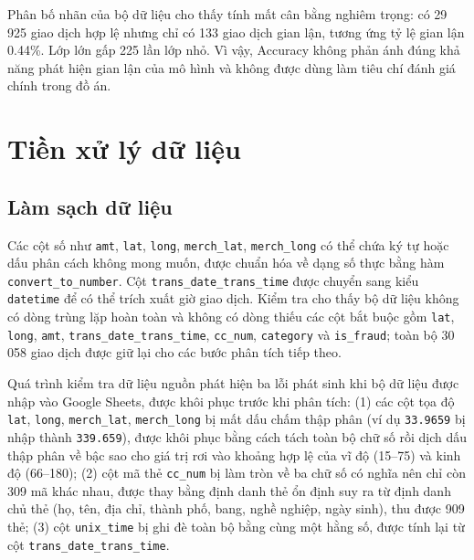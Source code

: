 Phân bố nhãn của bộ dữ liệu cho thấy tính mất cân bằng nghiêm trọng: có 29\,925 giao dịch hợp lệ nhưng chỉ có 133 giao dịch gian lận, tương ứng tỷ lệ gian lận 0{.}44\%. Lớp lớn gấp 225 lần lớp nhỏ. Vì vậy, Accuracy không phản ánh đúng khả năng phát hiện gian lận của mô hình và không được dùng làm tiêu chí đánh giá chính trong đồ án.

\section{Tiền xử lý dữ liệu}
\subsection{Làm sạch dữ liệu}
Các cột số như \texttt{amt}, \texttt{lat}, \texttt{long}, \texttt{merch\_lat}, \texttt{merch\_long} có thể chứa ký tự hoặc dấu phân cách không mong muốn, được chuẩn hóa về dạng số thực bằng hàm \texttt{convert\_to\_number}. Cột \texttt{trans\_date\_trans\_time} được chuyển sang kiểu \texttt{datetime} để có thể trích xuất giờ giao dịch. Kiểm tra cho thấy bộ dữ liệu không có dòng trùng lặp hoàn toàn và không có dòng thiếu các cột bắt buộc gồm \texttt{lat}, \texttt{long}, \texttt{amt}, \texttt{trans\_date\_trans\_time}, \texttt{cc\_num}, \texttt{category} và \texttt{is\_fraud}; toàn bộ 30\,058 giao dịch được giữ lại cho các bước phân tích tiếp theo.

Quá trình kiểm tra dữ liệu nguồn phát hiện ba lỗi phát sinh khi bộ dữ liệu được nhập vào Google Sheets, được khôi phục trước khi phân tích: (1) các cột tọa độ \texttt{lat}, \texttt{long}, \texttt{merch\_lat}, \texttt{merch\_long} bị mất dấu chấm thập phân (ví dụ \texttt{33{.}9659} bị nhập thành \texttt{339.659}), được khôi phục bằng cách tách toàn bộ chữ số rồi dịch dấu thập phân về bậc sao cho giá trị rơi vào khoảng hợp lệ của vĩ độ (15--75) và kinh độ (66--180); (2) cột mã thẻ \texttt{cc\_num} bị làm tròn về ba chữ số có nghĩa nên chỉ còn 309 mã khác nhau, được thay bằng định danh thẻ ổn định suy ra từ định danh chủ thẻ (họ, tên, địa chỉ, thành phố, bang, nghề nghiệp, ngày sinh), thu được 909 thẻ; (3) cột \texttt{unix\_time} bị ghi đè toàn bộ bằng cùng một hằng số, được tính lại từ cột \texttt{trans\_date\_trans\_time}.

